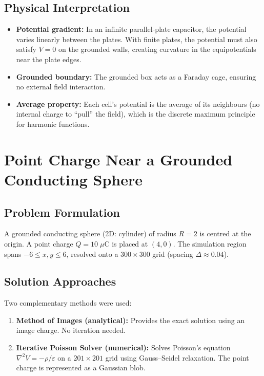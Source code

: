 \documentclass[11pt,a4paper]{article}
\begin{document}
\subsection{Physical Interpretation}
\begin{itemize}[leftmargin=2em]
\item \textbf{Potential gradient:} In an infinite parallel-plate capacitor, the potential varies linearly between the plates. With finite plates, the potential must also satisfy $V=0$ on the grounded walls, creating curvature in the equipotentials near the plate edges.
\item \textbf{Grounded boundary:} The grounded box acts as a Faraday cage, ensuring no external field interaction.
\item \textbf{Average property:} Each cell's potential is the average of its neighbours (no internal charge to ``pull'' the field), which is the discrete maximum principle for harmonic functions.
\end{itemize}

\newpage

\section{Point Charge Near a Grounded Conducting Sphere}

\subsection{Problem Formulation}

A grounded conducting sphere (2D: cylinder) of radius $R=2$ is centred at the origin. A point charge $Q=10\;\mu$C is placed at $(4,0)$. The simulation region spans $-6 \le x,y \le 6$, resolved onto a $300 \times 300$ grid (spacing $\Delta \approx 0.04$).

\subsection{Solution Approaches}

Two complementary methods were used:
\begin{enumerate}[leftmargin=2em]
\item \textbf{Method of Images (analytical):} Provides the exact solution using an image charge. No iteration needed.
\item \textbf{Iterative Poisson Solver (numerical):} Solves Poisson's equation $\nabla^2 V = -\rho/\varepsilon$ on a $201\times201$ grid using Gauss--Seidel relaxation. The point charge is represented as a Gaussian blob.
\end{enumerate}
\end{document}
